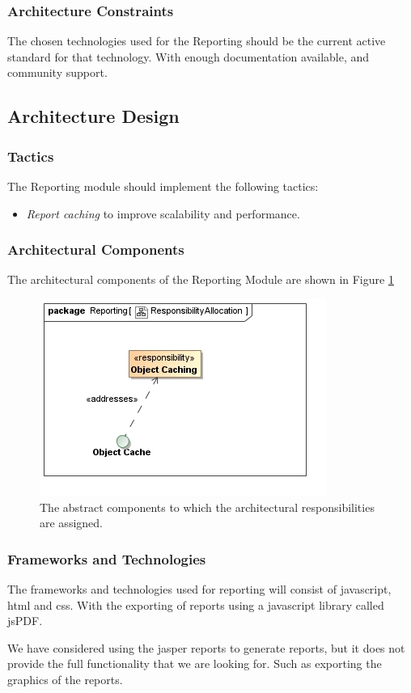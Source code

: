 \subsubsection{Architecture Constraints}
The chosen technologies used for the Reporting should be the current active
standard for that technology. With enough documentation available, and community support.

\subsection{Architecture Design}
\subsubsection{Tactics}
The Reporting module should implement the following tactics:
\begin{itemize}
  \item \textit{Report caching} to improve scalability and performance.
\end{itemize}

\subsubsection{Architectural Components}
The architectural components of the Reporting Module are shown in Figure \ref{fig:reportingResponsibilityAllocation}
\begin{figure}[H]
	\begin{center}
	\includegraphics[scale=0.5]{../Diagrams and Charts/Reporting/ResponsibilityAllocation.jpg}
	\caption{The abstract components to which the architectural responsibilities are assigned.}
	\label{fig:reportingResponsibilityAllocation}
	\end{center}
\end{figure}
\subsubsection{Frameworks and Technologies}
The frameworks and technologies used for reporting will consist of javascript,
html and css. With the exporting of reports using a javascript library called jsPDF.

We have considered using the jasper reports to generate reports, but it does
 not provide the full functionality that we are looking for. Such as exporting the graphics of the reports.
